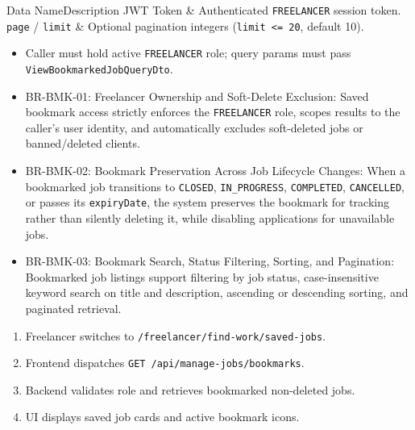 
\begin{specdatatable}{Data Name}{Description}
JWT Token & Authenticated \texttt{FREELANCER} session token.\\ \hline
\texttt{page} / \texttt{limit} & Optional pagination integers (\texttt{limit <= 20}, default 10).\\ \hline
\end{specdatatable}

\begin{itemize}[leftmargin=1.6em,topsep=3pt,itemsep=2pt,parsep=0pt,label=$\bullet$]
    \item Caller must hold active \texttt{FREELANCER} role; query params must pass \texttt{View\allowbreak{}Bookmarked\allowbreak{}Job\allowbreak{}Query\allowbreak{}Dto}.
\end{itemize}

\begin{itemize}[leftmargin=1.6em,topsep=3pt,itemsep=2pt,parsep=0pt,label=$\bullet$]\brrulelist
    \item BR-BMK-01: Freelancer Ownership and Soft-Delete Exclusion: Saved bookmark access strictly enforces the \texttt{FREELANCER} role, scopes results to the caller's user identity, and automatically excludes soft-deleted jobs or banned/deleted clients.
    \item BR-BMK-02: Bookmark Preservation Across Job Lifecycle Changes: When a bookmarked job transitions to \texttt{CLOSED}, \texttt{IN\_PROGRESS}, \texttt{COMPLETED}, \texttt{CANCELLED}, or passes its \texttt{expiryDate}, the system preserves the bookmark for tracking rather than silently deleting it, while disabling applications for unavailable jobs.
    \item BR-BMK-03: Bookmark Search, Status Filtering, Sorting, and Pagination: Bookmarked job listings support filtering by job status, case-insensitive keyword search on title and description, ascending or descending sorting, and paginated retrieval.
\end{itemize}

\begin{enumerate}[leftmargin=1.8em,topsep=3pt,itemsep=2pt,parsep=0pt]
    \item Freelancer switches to \texttt{/freelancer/find-work/saved-jobs}.
    \item Frontend dispatches \texttt{GET /api/manage-jobs/bookmarks}.
    \item Backend validates role and retrieves bookmarked non-deleted jobs.
    \item UI displays saved job cards and active bookmark icons.
\end{enumerate}

